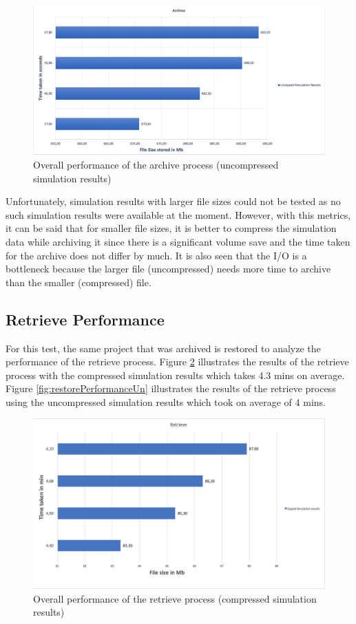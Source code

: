 \begin{figure}[H]
    \centering \includegraphics[scale=0.45]{grafiken/archiveUnzip.png}
    \caption{Overall performance of the archive process (uncompressed simulation results)}
    \label{fig:archivePerformanceUn}
\end{figure}

Unfortunately, simulation results with larger file sizes could not be tested as no such simulation results were available at the moment. However, with this metrics, it can be said that
for smaller file sizes, it is better to compress the simulation data while archiving it since there is a significant volume save and the time taken for the
archive does not differ by much. It is also seen that the I/O is a bottleneck because the larger file (uncompressed) needs more time to archive than the smaller (compressed) file. 

\subsection{Retrieve Performance}
For this test, the same project that was archived is restored to analyze the performance of the retrieve process. Figure \ref{fig:restorePerformance} illustrates
the results of the retrieve process with the compressed simulation results which takes 4.3 mins on average. Figure \ref{fig:restorePerformanceUn} illustrates the
results of the retrieve process using the uncompressed simulation results which took on average of 4 mins. 

\begin{figure}[H]
    \centering \includegraphics[scale=0.5]{grafiken/retrieveZip.png}
    \caption{Overall performance of the retrieve process (compressed simulation results)}
    \label{fig:restorePerformance}
\end{figure}

